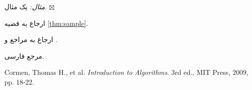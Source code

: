 \documentclass[11pt]{article}
\newenvironment{example}
{\smallskip \noindent \emph{مثال:}}
{\hfill $\boxtimes$ \smallskip}
\begin{document}
	\begin{example}
		یک مثال. 
	\end{example}
	
	ارجاع به قضیه 
	\ref{thm:sample}.
	
	ارجاع به مراجع
	\cite{persianreference}
	و
	\cite{CLRS}.
	
	
	
	
	\begin{thebibliography}{99}
		مرجع فارسی. 
		
		\begin{latin}	%
			
			Cormen, Thomas H., et al.
			\textit{Introduction to Algorithms}. 
			3rd ed., MIT Press, 2009, pp. 18-22. %
		\end{latin}	
	\end{thebibliography}
	\pagebreak
\end{document}

